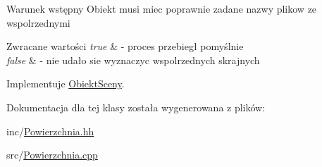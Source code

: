 \begin{DoxyPrecond}{Warunek wstępny}
Obiekt musi miec poprawnie zadane nazwy plikow ze wspolrzednymi 
\end{DoxyPrecond}

\begin{DoxyRetVals}{Zwracane wartości}
{\em true} & -\/ proces przebiegł pomyślnie \\
\hline
{\em false} & -\/ nie udało sie wyznaczyc wspolrzednych skrajnych \\
\hline
\end{DoxyRetVals}


Implementuje \hyperlink{classObiektSceny_a24dd0332c0755d7155128639a9a3e2b4}{Obiekt\+Sceny}.



Dokumentacja dla tej klasy została wygenerowana z plików\+:\begin{DoxyCompactItemize}
\item 
inc/\hyperlink{Powierzchnia_8hh}{Powierzchnia.\+hh}\item 
src/\hyperlink{Powierzchnia_8cpp}{Powierzchnia.\+cpp}\end{DoxyCompactItemize}
